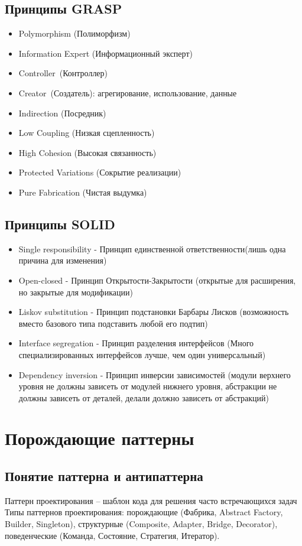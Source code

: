 \section{Принципы GRASP}
\begin{itemize}
\item Polymorphism (Полиморфизм)
\item Information Expert (Информационный эксперт)
\item Controller (Контроллер)
\item Creator (Создатель): агрегирование, использование, данные
\item Indirection (Посредник)
\item Low Coupling (Низкая сцепленность)
\item High Cohesion (Высокая связанность)
\item Protected Variations (Сокрытие реализации)
\item Pure Fabrication (Чистая выдумка)
\end{itemize}
\newpage

\section{Принципы SOLID}
\begin{itemize}
\item Single responsibility - Принцип единственной ответственности(лишь одна причина для изменения)
\item Open-closed - Принцип Открытости-Закрытости (открытые для расширения, но закрытые для модификации)
\item Liskov substitution - Принцип подстановки Барбары Лисков (возможность вместо базового типа подставить любой его подтип)
\item Interface segregation - Принцип разделения интерфейсов (Много специализированных интерфейсов лучше, чем один универсальный)
\item Dependency inversion - Принцип инверсии зависимостей (модули верхнего уровня не должны зависеть от модулей нижнего уровня, абстракции не должны зависеть от деталей, делали должно зависеть от абстракций)
\end{itemize}

\newpage
\chapter{Порождающие паттерны}
\section{Понятие паттерна и антипаттерна}
Паттерн проектирования – шаблон кода для решения часто встречающихся задач
Типы паттернов проектирования: порождающие (Фабрика, Abstract Factory, Builder, Singleton), структурные (Composite, Adapter, Bridge, Decorator), поведенческие (Команда, Состояние, Стратегия, Итератор).

